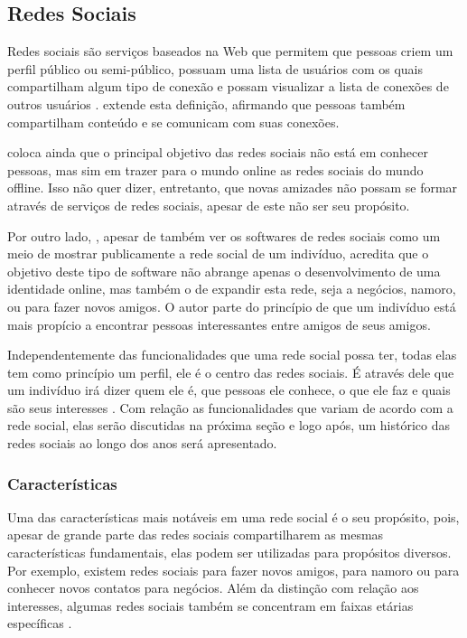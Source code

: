 \documentclass[diss]{template/setrem}
\begin{document}
\subsection{Redes Sociais}
Redes sociais são serviços baseados na Web que permitem que pessoas criem um perfil público ou semi-público, possuam uma lista de usuários com os quais compartilham algum tipo de conexão e possam visualizar a lista de conexões de outros usuários \citep{Boyd2007}. \citet{Mayfield2008} extende esta definição, afirmando que pessoas também compartilham conteúdo e se comunicam com suas conexões.

\citet{Boyd2007} coloca ainda que o principal objetivo das redes sociais não está em conhecer pessoas, mas sim em trazer para o mundo online as redes sociais do mundo offline. Isso não quer dizer, entretanto, que novas amizades não possam se formar através de serviços de redes sociais, apesar de este não ser seu propósito.

Por outro lado, \citet{Farkas2007}, apesar de também ver os softwares de redes sociais como um meio de mostrar publicamente a rede social de um indivíduo, acredita que o objetivo deste tipo de software não abrange apenas o desenvolvimento de uma identidade online, mas também o de expandir esta rede, seja a negócios, namoro, ou para fazer novos amigos. O autor parte do princípio de que um indivíduo está mais propício a encontrar pessoas interessantes entre amigos de seus amigos.

Independentemente das funcionalidades que uma rede social possa ter, todas elas tem como princípio um perfil, ele é o centro das redes sociais. É através dele que um indivíduo irá dizer quem ele é, que pessoas ele conhece, o que ele faz e quais são seus interesses \citep{Farkas2007, Boyd2007}. Com relação as funcionalidades que variam de acordo com a rede social, elas serão discutidas na próxima seção e logo após, um histórico das redes sociais ao longo dos anos será apresentado.

\subsubsection{Características}
Uma das características mais notáveis em uma rede social é o seu propósito, pois, apesar de grande parte das redes sociais compartilharem as mesmas características fundamentais, elas podem ser utilizadas para propósitos diversos. Por exemplo, existem redes sociais para fazer novos amigos, para namoro ou para conhecer novos contatos para negócios. Além da distinção com relação aos interesses, algumas redes sociais também se concentram em faixas etárias específicas \citep{Farkas2007}.
\end{document}
